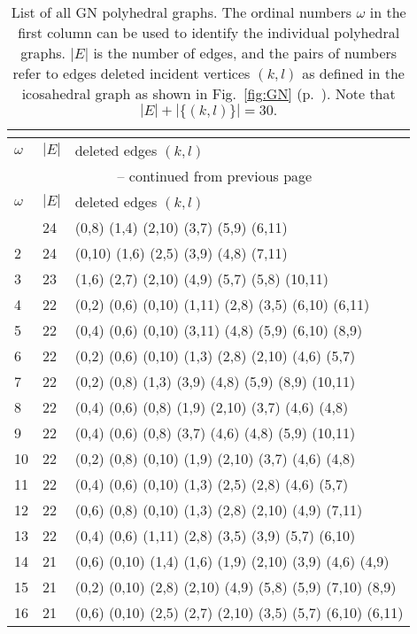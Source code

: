\footnotesize{\begin{longtable}{lll}
    \caption{List of all GN polyhedral graphs. The ordinal numbers $\omega$ in the first column
    can be used to identify the individual polyhedral graphs.
    $|E|$ is the number of edges, and the pairs of numbers refer to edges deleted
    incident vertices $(k,l)$ as defined in the icosahedral graph
    as shown in Fig.~\ref{fig:GN} (p.~\pageref{fig:GN}). Note that $|E|+|\{(k,l)\}|=30.$}\\
    \label{tab:icosubgraphs}\\
%
\toprule
    $\omega$  & $|E|$  &  deleted edges $(k,l)$\\\midrule
\endfirsthead
\multicolumn{3}{c}{\tablename~\thetable{} -- continued from previous page}\\
\toprule
    $\omega$  & $|E|$  &  deleted edges $(k,l)$\\\midrule
\endhead
\bottomrule\endfoot
1   & 24 & (0,8) (1,4) (2,10) (3,7) (5,9) (6,11) \\
2   & 24 & (0,10) (1,6) (2,5) (3,9) (4,8) (7,11) \\
3   & 23 & (1,6) (2,7) (2,10) (4,9) (5,7) (5,8) (10,11) \\
4   & 22 & (0,2) (0,6) (0,10) (1,11) (2,8) (3,5) (6,10) (6,11) \\
5   & 22 & (0,4) (0,6) (0,10) (3,11) (4,8) (5,9) (6,10) (8,9) \\
6   & 22 & (0,2) (0,6) (0,10) (1,3) (2,8) (2,10) (4,6) (5,7) \\
7   & 22 & (0,2) (0,8) (1,3) (3,9) (4,8) (5,9) (8,9) (10,11) \\
8   & 22 & (0,4) (0,6) (0,8) (1,9) (2,10) (3,7) (4,6) (4,8) \\
9   & 22 & (0,4) (0,6) (0,8) (3,7) (4,6) (4,8) (5,9) (10,11) \\
10  & 22 & (0,2) (0,8) (0,10) (1,9) (2,10) (3,7) (4,6) (4,8) \\
11  & 22 & (0,4) (0,6) (0,10) (1,3) (2,5) (2,8) (4,6) (5,7) \\
12  & 22 & (0,6) (0,8) (0,10) (1,3) (2,8) (2,10) (4,9) (7,11) \\
13  & 22 & (0,4) (0,6) (1,11) (2,8) (3,5) (3,9) (5,7) (6,10) \\
14  & 21 & (0,6) (0,10) (1,4) (1,6) (1,9) (2,10) (3,9) (4,6) (4,9) \\
15  & 21 & (0,2) (0,10) (2,8) (2,10) (4,9) (5,8) (5,9) (7,10) (8,9) \\
16  & 21 & (0,6) (0,10) (2,5) (2,7) (2,10) (3,5) (5,7) (6,10) (6,11) \\

\end{longtable}}
